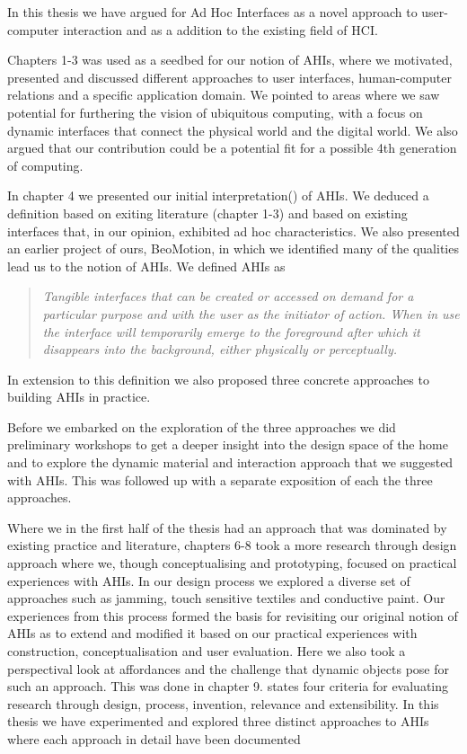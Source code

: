 
In this thesis we have argued for Ad Hoc Interfaces as a novel approach to user-computer interaction and as a addition to the existing field of HCI. 

Chapters 1-3 was used as a seedbed for our notion of AHIs, where we motivated, presented and discussed different approaches to user interfaces, human-computer relations and a specific application domain.
We pointed to areas where we saw potential for furthering the vision of ubiquitous computing, with a focus on dynamic interfaces that connect the physical world and the digital world.
We also argued that our contribution could be a potential fit for a possible 4th generation of computing.  

In chapter 4 we presented our initial interpretation() of AHIs.
We deduced a definition based on exiting literature (chapter 1-3) and based on existing interfaces that, in our opinion, exhibited ad hoc characteristics.
We also presented an earlier project of ours, BeoMotion, in which we identified many of the qualities lead us to the notion of AHIs.
We defined AHIs as 

\begin{quotation}
\emph{Tangible interfaces that can be created or accessed on demand for a particular purpose and with the user as the initiator of action. When in use the interface will temporarily emerge to the foreground after which it disappears into the background, either physically or perceptually.}
\end{quotation}
In extension to this definition we also proposed three concrete approaches to building AHIs in practice.

Before we embarked on the exploration of the three approaches we did preliminary workshops to get a deeper insight into the design space of the home and to explore the dynamic material and interaction approach that we suggested with AHIs.
This was followed up with a separate exposition of each the three approaches.

Where we in the first half of the thesis had an approach that was dominated by existing practice and literature, chapters 6-8 took a more research through design approach where we, though conceptualising and prototyping, focused on practical experiences with AHIs.
In our design process we explored a diverse set of approaches such as jamming, touch sensitive textiles and conductive paint.
Our experiences from this process formed the basis for revisiting our original notion of AHIs as to extend and modified it based on our practical experiences with construction, conceptualisation and user evaluation.
Here we also took a perspectival look at affordances and the challenge that dynamic objects pose for such an approach.
This was done in chapter 9.
\blank
\citet{zimmerman2007research} states four criteria for evaluating research through design, process, invention, relevance and extensibility.
In this thesis we have experimented and explored three distinct approaches to AHIs where each approach in detail have been documented


